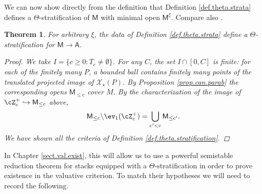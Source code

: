 \documentclass[openany]{amsbook}
\newtheorem{theorem}{Theorem}[chapter]
\theoremstyle{definition}
\theoremstyle{remark}
\numberwithin{equation}{section}
\newcommand{\cX}{\mathcal{X}}
\renewcommand{\-}{\operatorname{-}}
\newcommand{\bM}{\mathsf{M}}
\newcommand{\bA}{\mathsf{A}}
\begin{document}
We can now show directly from the definition that Definition \ref{def.theta.strata} defines a $\Theta$-stratification of $\bM$ with minimal open $\bM^{\xi}$. Compare also \cite[\S 8]{AHLHModuliForStacks}.
\begin{theorem}\label{thm.theta.strat.Hitchin}
    For arbitrary $\xi$, the data of Definition \ref{def.theta.strata} define a $\Theta$-stratification for $\bM \to \bA$.
    \begin{proof}
        We take $I = \{ c \ge 0 : T_c \neq \emptyset\}$. For any $C$, the set $I \cap [0, C]$ is finite: for each of the finitely many $P$, a bounded ball contains finitely many points of the translated projected image of $\cX_\star(P)$. By Proposition \ref{prop.can.parab} the corresponding opens $\bM_{\le c}$ cover $M$. By the characterization of the image of $\cZ_c^{+} \hookrightarrow \bM_{\le c}$ above, 
        $$
            \bM_{\le c} \backslash \ev_1(\cZ_c^{+}) = \bigcup_{c' < c} \bM_{\le c'}.
        $$
        We have shown all the criteria of Definition \ref{def.theta.stratification}.
    \end{proof}
\end{theorem}

In Chapter \ref{sect.val.exist}, this will allow us to use a powerful semistable reduction theorem for stacks equipped with a $\Theta$-stratification in order to prove existence in the valuative criterion. To match their hypotheses we will need to record the following.
\end{document}
